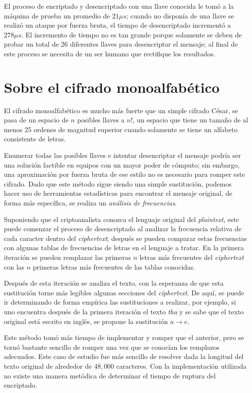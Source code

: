 \documentclass{article}
\begin{document}
        El proceso de encriptado y desencriptado con una llave conocida le tomó a la máquina de prueba un promedio de $21 \mu s$; cuando no disponía de una llave se realizó un ataque por fuerza bruta, el tiempo de desencriptado incrementó a $278 \mu s$. El incremento de tiempo no es tan grande porque solamente se deben de probar un total de 26 diferentes llaves para desencriptar el mensaje; al final de este proceso se necesita de un ser humano que rectifique los resultados.

    \section{Sobre el cifrado monoalfabético}
        El cifrado monoalfabético es mucho más fuerte que un simple cifrado César, se pasa de un espacio de $n$ posibles llaves a $n!$, un espacio que tiene un tamaño de al menos 25 ordenes de magnitud superior cuando solamente se tiene un alfabeto consistente de letras. 
        
        Enumerar todas las posibles llaves e intentar desencriptar el mensaje podría ser una solución factible en equipos con un mayor poder de cómputo; sin embargo, una aproximación por fuerza bruta de ese estilo no es necesario para romper este cifrado. Dado que este método sigue siendo una simple sustitución, podemos hacer uso de herramientas estadísticas para encontrar el mensaje original, de forma más específica, se realiza un \emph{análisis de frecuencias}.

        Suponiendo que el criptoanalista conozca el lenguaje original del \emph{plaintext}, este puede comenzar el proceso de desencriptado al analizar la frecuencia relativa de cada caracter dentro del \emph{ciphertext}; después se pueden comparar estas frecuencias con algunas tablas de frecuencias de letras en el lenguaje a tratar. En la primera iteración se pueden remplazar las primeras $n$ letras más frecuentes del \emph{ciphertext} con las $n$ primeras letras más frecuentes de las tablas conocidas.

        Después de esta iteración se analiza el texto, con la esperanza de que esta sustitución torne más legibles algunas secciones del \emph{ciphertext}. De aquí, se puede ir determinando de forma empírica las sustituciones a realizar, por ejemplo, si uno encuentra después de la primera iteración el texto \emph{tha} y se sabe que el texto original está escrito en inglés, se propone la sustitución $a \rightarrow e$.

        Este método tomó más tiempo de implementar y romper que el anterior, pero se tornó bastante sencillo de romper una vez que se conocían los remplazos adecuados. Este caso de estudio fue más sencillo de resolver dada la longitud del texto original de alrededor de $48,000$ caracteres. Con la implementación utilizada no existe una manera metódica de determinar el tiempo de ruptura del encriptado.
\end{document}
